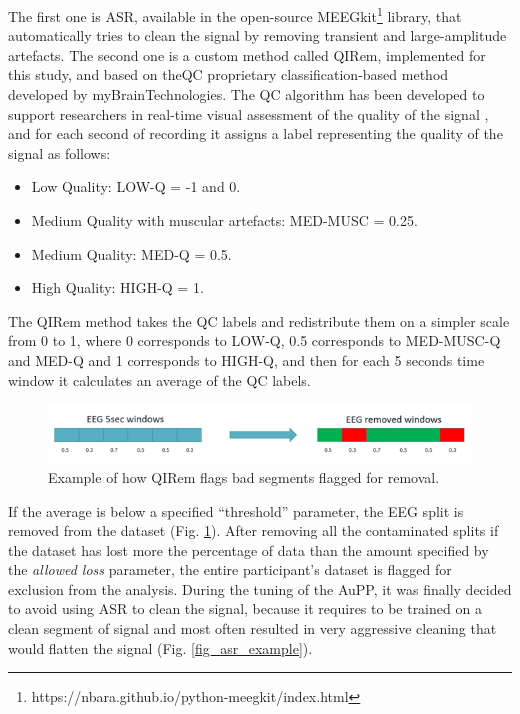 The first one is  \ac{ASR}, available in the open-source MEEGkit\footnote{https://nbara.github.io/python-meegkit/index.html}  library, that automatically tries to clean the signal by removing transient and large-amplitude artefacts. The second one is a custom method called \ac{QIRem}, implemented for this study, and based on the\ac{QC} proprietary classification-based method developed by myBrainTechnologies. The \ac{QC} algorithm has been developed to support researchers in real-time visual assessment of the quality of the signal \cite{grosselin_quality_2019}, and for each second of recording it assigns a label representing the quality of the signal as follows:
\begin{itemize}
\item 	Low Quality: LOW-Q = -1 and 0. 
\item 	Medium Quality with muscular artefacts: MED-MUSC = 0.25. 
\item 	Medium Quality: MED-Q = 0.5. 
\item     High Quality: HIGH-Q = 1.
\end{itemize}

The \ac{QIRem} method takes the \ac{QC} labels and redistribute them on a simpler scale from 0 to 1, where 0 corresponds to LOW-Q, 0.5 corresponds to MED-MUSC-Q and MED-Q and 1 corresponds to HIGH-Q, and then for each 5 seconds time window it calculates an average of the \ac{QC} labels.

\begin{figure}[h!]
\includegraphics[width=15cm]{img/methods/qirem_example.png}
\centering
\caption{Example of how QIRem flags bad segments flagged for removal.} \label{fig_qirem_example}
\end{figure}

If the average is below a specified “threshold” parameter, the EEG split is removed from the dataset (Fig. \ref{fig_qirem_example}). After removing all the contaminated splits if the dataset has lost more the percentage of data than the amount specified by the \emph{allowed loss} parameter, the entire participant’s dataset is flagged for exclusion from the analysis. During the tuning of the \ac{AuPP}, it was finally decided to avoid using \ac{ASR} to clean the signal, because it requires to be trained on a clean segment of signal and most often resulted in very aggressive cleaning that would flatten the signal (Fig. \ref{fig_asr_example}).


